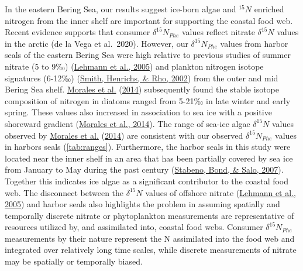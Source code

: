 \documentclass [11pt, proquest] {uwthesis}[2015/03/03]
\begin{document}
In the eastern Bering Sea, our results suggest ice-born algae and \(^{15}N\) enriched nitrogen from the inner shelf are important for supporting the coastal food web. Recent evidence supports that consumer \(\delta^{15}N_{Phe}\) values reflect nitrate \(\delta^{15}N\) values in the arctic (de la Vega et al.~2020). However, our \(\delta^{15}N_{Phe}\) values from harbor seals of the eastern Bering Sea were high relative to previous studies of summer nitrate (5 to 9‰) (\protect\hyperlink{ref-Lehmann2005}{Lehmann et al., 2005}) and plankton nitrogen isotope signatures (6-12‰) (\protect\hyperlink{ref-Smith2002}{Smith, Henrichs, \& Rho, 2002}) from the outer and mid Bering Sea shelf. \protect\hyperlink{ref-Morales2014}{Morales et al.} (\protect\hyperlink{ref-Morales2014}{2014}) subsequently found the stable isotope composition of nitrogen in diatoms ranged from 5-21‰ in late winter and early spring. These values also increased in association to sea ice with a positive shoreward gradient (\protect\hyperlink{ref-Morales2014}{Morales et al., 2014}). The range of sea-ice algae \(\delta^{15}N\) values observed by \protect\hyperlink{ref-Morales2014}{Morales et al.} (\protect\hyperlink{ref-Morales2014}{2014}) are consistent with our observed \(\delta^{15}N_{Phe}\) values in harbors seals (\ref{tab:ranges}). Furthermore, the harbor seals in this study were located near the inner shelf in an area that has been partially covered by sea ice from January to May during the past century (\protect\hyperlink{ref-Stabeno2007}{Stabeno, Bond, \& Salo, 2007}). Together this indicates ice algae as a significant contributor to the coastal food web. The disconnect between the \(\delta^{15}N\) values of offshore nitrate (\protect\hyperlink{ref-Lehmann2005}{Lehmann et al., 2005}) and harbor seals also highlights the problem in assuming spatially and temporally discrete nitrate or phytoplankton measurements are representative of resources utilized by, and assimilated into, coastal food webs. Consumer \(\delta^{15}N_{Phe}\) measurements by their nature represent the N assimilated into the food web and integrated over relatively long time scales, while discrete measurements of nitrate may be spatially or temporally biased.
\end{document}
